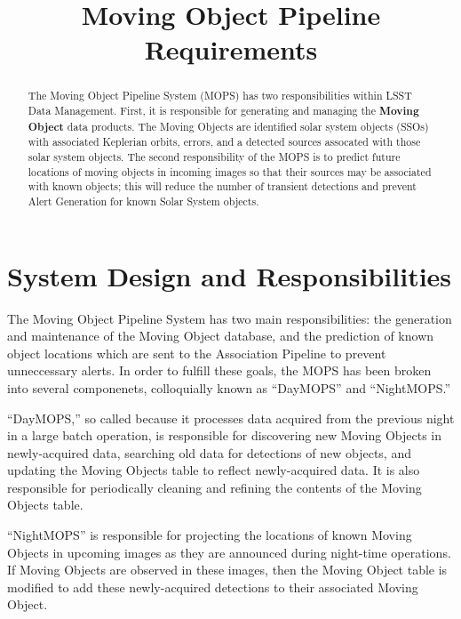 \documentclass[12pt,preprint]{aastex}
\begin{document}
\title{Moving Object Pipeline Requirements}

\author{}

\begin{abstract}

The Moving Object Pipeline System (MOPS) has two responsibilities
within LSST Data Management.  First, it is responsible for generating
and managing the \textbf{Moving Object} data products.  The Moving
Objects are identified solar system objects (SSOs) with associated
Keplerian orbits, errors, and a detected sources assocated with those
solar system objects.  The second responsibility of the MOPS is to
predict future locations of moving objects in incoming images so that
their sources may be associated with known objects; this will reduce
the number of transient detections and prevent Alert Generation for
known Solar System objects.

\end{abstract}

\tableofcontents


\section{System Design and Responsibilities}

The Moving Object Pipeline System has two main responsibilities: the
generation and maintenance of the Moving Object database, and the
prediction of known object locations which are sent to the Association
Pipeline to prevent unneccessary alerts.  In order to fulfill these
goals, the MOPS has been broken into several componenets, colloquially
known as ``DayMOPS'' and ``NightMOPS.''
 

``DayMOPS,'' so called because it processes data acquired from the
previous night in a large batch operation, is responsible for
discovering new Moving Objects in newly-acquired data, searching old
data for detections of new objects, and updating the Moving Objects
table to reflect newly-acquired data. It is also responsible for
periodically cleaning and refining the contents of the Moving Objects
table.

``NightMOPS'' is responsible for projecting the locations of known
Moving Objects in upcoming images as they are announced during
night-time operations.  If Moving Objects are observed in these
images, then the Moving Object table is modified to add these
newly-acquired detections to their associated Moving Object.
\end{document}
